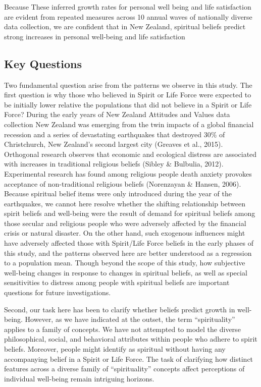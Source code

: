 \documentclass[
  english,
  man,floatsintext]{apa6}
\begin{document}
Because These inferred growth rates for personal well being and life satisfaction are evident from repeated measures across 10 annual waves of nationally diverse data collection, we are confident that in New Zealand, spiritual beliefs predict strong increases in personal well-being and life satisfaction

\hypertarget{key-questions}{%
\subsection{Key Questions}\label{key-questions}}

Two fundamental question arise from the patterns we observe in this study. The first question is why those who believed in Spirit or Life Force were expected to be initially lower relative the populations that did not believe in a Spirit or Life Force? During the early years of New Zealand Attitudes and Values data collection New Zealand was emerging from the twin impacts of a global financial recession and a series of devastating earthquakes that destroyed 30\% of Christchurch, New Zealand's second largest city (Greaves et al., 2015). Orthogonal research observes that economic and ecological distress are associated with increases in traditional religious beliefs (Sibley \& Bulbulia, 2012). Experimental research has found among religious people death anxiety provokes acceptance of non-traditional religious beliefs (Norenzayan \& Hansen, 2006). Because spiritual belief items were only introduced during the year of the earthquakes, we cannot here resolve whether the shifting relationship between spirit beliefs and well-being were the result of demand for spiritual beliefs among those secular and religious people who were adversely affected by the financial crisis or natural disaster. On the other hand, such exogenous influences might have adversely affected those with Spirit/Life Force beliefs in the early phases of this study, and the patterns observed here are better understood as a regression to a population mean. Though beyond the scope of this study, how subjective well-being changes in response to changes in spiritual beliefs, as well as special sensitivities to distress among people with spiritual beliefs are important questions for future investigations.

Second, our task here has been to clarify whether beliefs predict growth in well-being. However, as we have indicated at the outset, the term ``spirituality'' applies to a family of concepts. We have not attempted to model the diverse philosophical, social, and behavioral attributes within people who adhere to spirit beliefs. Moreover, people might identify as spiritual without having any accompanying belief in a Spirit or Life Force. The task of clarifying how distinct features across a diverse family of ``spirituality'' concepts affect perceptions of individual well-being remain intriguing horizons.
\end{document}
